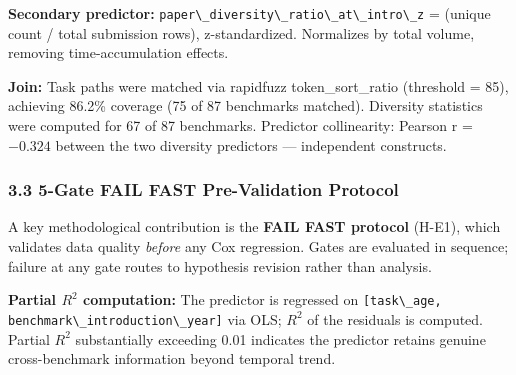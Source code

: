 \textbf{Secondary predictor:} \texttt{paper\textbackslash \_diversity\textbackslash \_ratio\textbackslash \_at\textbackslash \_intro\textbackslash \_z} = (unique count / total submission rows), z-standardized. Normalizes by total volume, removing time-accumulation effects.

\textbf{Join:} Task paths were matched via rapidfuzz token\_sort\_ratio (threshold = 85), achieving 86.2\% coverage (75 of 87 benchmarks matched). Diversity statistics were computed for 67 of 87 benchmarks. Predictor collinearity: Pearson r = $-0.324$ between the two diversity predictors --- independent constructs.

\subsubsection{3.3 5-Gate FAIL FAST Pre-Validation Protocol}

A key methodological contribution is the \textbf{FAIL FAST protocol} (H-E1), which validates data quality \textit{before} any Cox regression. Gates are evaluated in sequence; failure at any gate routes to hypothesis revision rather than analysis.

\begin{table}[htbp]
\centering
{}
\end{table}

\textbf{Partial $R^2$ computation:} The predictor is regressed on \texttt{[task\textbackslash \_age, benchmark\textbackslash \_introduction\textbackslash \_year]} via OLS; $R^2$ of the residuals is computed. Partial $R^2$ substantially exceeding 0.01 indicates the predictor retains genuine cross-benchmark information beyond temporal trend.

